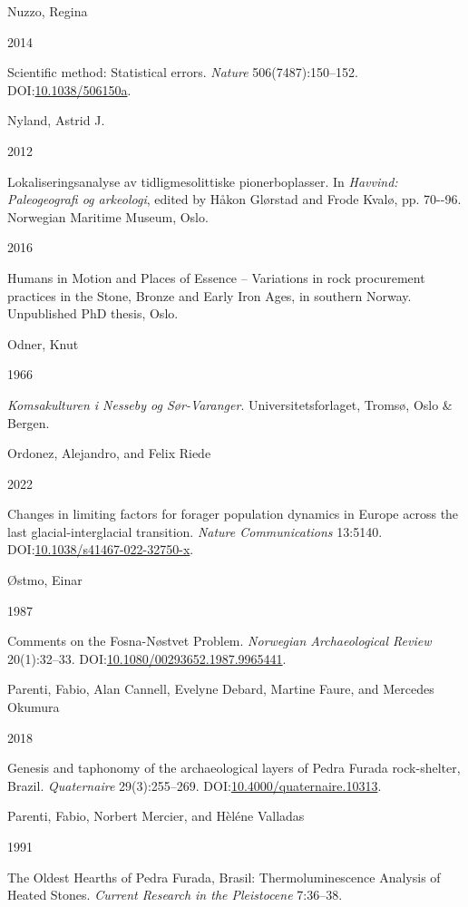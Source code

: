 \documentclass[
  a4paper,
  oneside]{uiophdthesis}
\newlength{\cslhangindent}
\newlength{\csllabelwidth}
\newlength{\cslentryspacingunit} %
\newenvironment{CSLReferences}[2] %
 {%
  \setlength{\parindent}{0pt}
  \ifodd #1
  \let\oldpar\par
  \def\par{\hangindent=\cslhangindent\oldpar}
  \fi
  \setlength{\parskip}{#2\cslentryspacingunit}
 }%
 {}
\newcommand{\CSLBlock}[1]{#1\hfill\break}
\newcommand{\CSLLeftMargin}[1]{\parbox[t]{\csllabelwidth}{#1}}
\newcommand{\CSLRightInline}[1]{\parbox[t]{\linewidth - \csllabelwidth}{#1}\break}
\begin{document}
\begin{CSLReferences}{0}{0}
\leavevmode{}%
\CSLBlock{Nuzzo, Regina}
\CSLLeftMargin{ 2014}
\CSLRightInline{{Scientific method: Statistical errors}. \emph{Nature} 506(7487):150--152. DOI:\href{https://doi.org/10.1038/506150a}{10.1038/506150a}.}

\leavevmode{}%
\CSLBlock{Nyland, Astrid J.}
\CSLLeftMargin{ 2012}
\CSLRightInline{{Lokaliseringsanalyse av tidligmesolittiske pionerboplasser}. In \emph{{Havvind: Paleogeografi og arkeologi}}, edited by Håkon Glørstad and Frode Kvalø, pp. 70-\/-96. Norwegian Maritime Museum, Oslo.}

\leavevmode{}%
\CSLLeftMargin{ 2016 }
\CSLRightInline{{Humans in Motion and Places of Essence -- Variations in rock procurement practices in the Stone, Bronze and Early Iron Ages, in southern Norway}. Unpublished PhD thesis, Oslo.}

\leavevmode{}%
\CSLBlock{Odner, Knut}
\CSLLeftMargin{ 1966}
\CSLRightInline{\emph{{Komsakulturen i Nesseby og Sør-Varanger}}. Universitetsforlaget, Tromsø, Oslo \& Bergen.}

\leavevmode{}%
\CSLBlock{Ordonez, Alejandro, and Felix Riede}
\CSLLeftMargin{ 2022}
\CSLRightInline{{Changes in limiting factors for forager population dynamics in Europe across the last glacial-interglacial transition}. \emph{Nature Communications} 13:5140. DOI:\href{https://doi.org/10.1038/s41467-022-32750-x}{10.1038/s41467-022-32750-x}.}

\leavevmode{}%
\CSLBlock{Østmo, Einar}
\CSLLeftMargin{ 1987}
\CSLRightInline{{Comments on the Fosna-Nøstvet Problem}. \emph{Norwegian Archaeological Review} 20(1):32--33. DOI:\href{https://doi.org/10.1080/00293652.1987.9965441}{10.1080/00293652.1987.9965441}.}

\leavevmode{}%
\CSLBlock{Parenti, Fabio, Alan Cannell, Evelyne Debard, Martine Faure, and Mercedes Okumura}
\CSLLeftMargin{ 2018}
\CSLRightInline{Genesis and taphonomy of the archaeological layers of Pedra Furada rock-shelter, Brazil. \emph{Quaternaire} 29(3):255--269. DOI:\href{https://doi.org/10.4000/quaternaire.10313}{10.4000/quaternaire.10313}.}

\leavevmode{}%
\CSLBlock{Parenti, Fabio, Norbert Mercier, and Hèléne Valladas}
\CSLLeftMargin{ 1991}
\CSLRightInline{The Oldest Hearths of Pedra Furada, Brasil: Thermoluminescence Analysis of Heated Stones. \emph{Current Research in the Pleistocene} 7:36--38.}


\end{CSLReferences}
\end{document}
